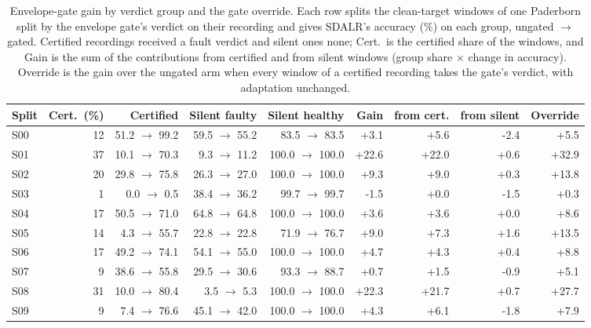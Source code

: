 \begin{table}[htbp]
\centering
\begingroup
\small
\setlength{\tabcolsep}{4pt}
\begin{tabular}{lrrrrrrrr}
\toprule
Split & Cert.\ (\%) & Certified & Silent faulty & Silent healthy & Gain & from cert. & from silent & Override \\
\midrule
S00 & 12 & 51.2 $\to$ 99.2 & 59.5 $\to$ 55.2 & 83.5 $\to$ 83.5 & +3.1 & +5.6 & -2.4 & +5.5 \\
S01 & 37 & 10.1 $\to$ 70.3 & 9.3 $\to$ 11.2 & 100.0 $\to$ 100.0 & +22.6 & +22.0 & +0.6 & +32.9 \\
S02 & 20 & 29.8 $\to$ 75.8 & 26.3 $\to$ 27.0 & 100.0 $\to$ 100.0 & +9.3 & +9.0 & +0.3 & +13.8 \\
S03 & 1 & 0.0 $\to$ 0.5 & 38.4 $\to$ 36.2 & 99.7 $\to$ 99.7 & -1.5 & +0.0 & -1.5 & +0.3 \\
S04 & 17 & 50.5 $\to$ 71.0 & 64.8 $\to$ 64.8 & 100.0 $\to$ 100.0 & +3.6 & +3.6 & +0.0 & +8.6 \\
S05 & 14 & 4.3 $\to$ 55.7 & 22.8 $\to$ 22.8 & 71.9 $\to$ 76.7 & +9.0 & +7.3 & +1.6 & +13.5 \\
S06 & 17 & 49.2 $\to$ 74.1 & 54.1 $\to$ 55.0 & 100.0 $\to$ 100.0 & +4.7 & +4.3 & +0.4 & +8.8 \\
S07 & 9 & 38.6 $\to$ 55.8 & 29.5 $\to$ 30.6 & 93.3 $\to$ 88.7 & +0.7 & +1.5 & -0.9 & +5.1 \\
S08 & 31 & 10.0 $\to$ 80.4 & 3.5 $\to$ 5.3 & 100.0 $\to$ 100.0 & +22.3 & +21.7 & +0.7 & +27.7 \\
S09 & 9 & 7.4 $\to$ 76.6 & 45.1 $\to$ 42.0 & 100.0 $\to$ 100.0 & +4.3 & +6.1 & -1.8 & +7.9 \\
\bottomrule
\end{tabular}\par
\endgroup
\caption{Envelope-gate gain by verdict group and the gate override. Each row splits the clean-target windows of one Paderborn split by the envelope gate's verdict on their recording and gives SDALR's accuracy (\%) on each group, ungated $\to$ gated. Certified recordings received a fault verdict and silent ones none; Cert.\ is the certified share of the windows, and Gain is the sum of the contributions from certified and from silent windows (group share $\times$ change in accuracy). Override is the gain over the ungated arm when every window of a certified recording takes the gate's verdict, with adaptation unchanged.}
\label{tab:gateacc}
\end{table}
